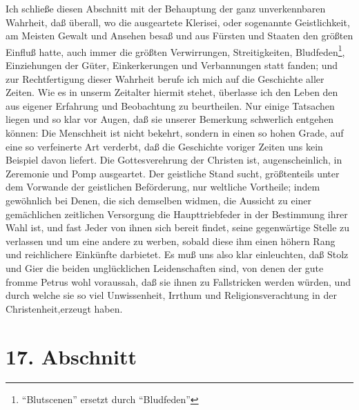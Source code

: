 Ich schließe diesen Abschnitt mit der Behauptung der ganz unverkennbaren
Wahrheit, daß überall, wo die ausgeartete Klerisei, oder sogenannte
Geistlichkeit, am Meisten Gewalt und Ansehen besaß und aus Fürsten und
Staaten den größten Einfluß hatte, auch immer die größten Verwirrungen,
Streitigkeiten, Bludfeden\footnote{"`Blutscenen"' ersetzt durch "`Bludfeden"'}, Einziehungen der Güter, Einkerkerungen und
Verbannungen statt fanden; und zur Rechtfertigung dieser Wahrheit berufe ich
mich auf die Geschichte aller Zeiten. Wie es in unserm Zeitalter hiermit stehet,
überlasse ich den Leben den aus eigener Erfahrung und Beobachtung zu
beurtheilen. Nur einige Tatsachen liegen und so klar vor Augen, daß sie unserer
Bemerkung schwerlich entgehen können: Die Menschheit ist nicht bekehrt, sondern
in einen so hohen Grade, auf eine so verfeinerte Art verderbt, daß die
Geschichte voriger Zeiten uns kein Beispiel davon liefert. Die Gottesverehrung
der Christen ist, augenscheinlich, in Zeremonie und Pomp ausgeartet. Der
geistliche Stand sucht, größtenteils unter dem Vorwande der geistlichen
Beförderung, nur weltliche Vortheile; indem gewöhnlich bei Denen, die sich
demselben widmen, die Aussicht zu einer gemächlichen zeitlichen Versorgung die
Haupttriebfeder in der Bestimmung ihrer Wahl ist, und fast Jeder von ihnen sich
bereit findet, seine gegenwärtige Stelle zu verlassen und um eine andere zu
werben, sobald diese ihm einen höhern Rang und reichlichere Einkünfte darbietet.
Es muß uns also klar einleuchten, daß Stolz und Gier die beiden unglücklichen
Leidenschaften sind, von denen der gute fromme Petrus wohl voraussah, daß sie
ihnen zu Fallstricken werden würden, und durch welche sie so viel Unwissenheit,
Irrthum und Religionsverachtung in der Christenheit,erzeugt haben.

\section{17. Abschnitt} \label{kap7_ab17}

